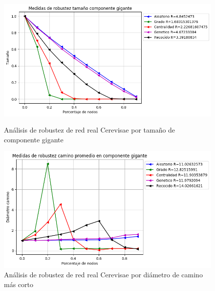 \begin{figure}[!htb]
    \begin{minipage}{0.48\textwidth}
        \centering
        \includegraphics[scale=0.4]{CapituloAAnexos/imagenesAnexoC/Robustez/grafica_GC20180510_203826cerevisiae}
        \caption{Análisis de robustez de red real Cerevisae por tamaño de componente gigante}
    \end{minipage}\hfill
   \begin{minipage}{0.48\textwidth}
         \centering
       \includegraphics[scale=0.4]{CapituloAAnexos/imagenesAnexoC/Robustez/grafica_APL20180510_203826cerevisiae}
        \caption{Análisis de robustez de red real Cerevisae por diámetro de camino más corto}
    \end{minipage}
\end{figure}


